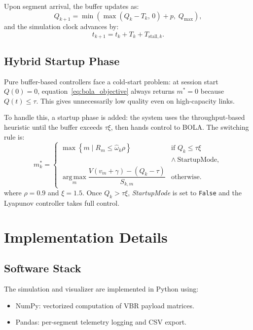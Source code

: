 \documentclass[conference]{IEEEtran}
\begin{document}
Upon segment arrival, the buffer updates as:
\begin{equation}
  Q_{k+1}=\min\!\left(\max(Q_k-T_k,\,0)+p,\;Q_{\max}\right),
  \label{eq:buffer_evolution}
\end{equation}
and the simulation clock advances by:
\begin{equation}
  t_{k+1}=t_k+T_k+T_{\text{stall},k}.
  \label{eq:clock_advance}
\end{equation}

\subsection{Hybrid Startup Phase}

Pure buffer-based controllers face a cold-start problem: at session
start $Q(0)=0$, equation~\eqref{eq:bola_objective} always returns $m^*=0$
because $Q(t)\le\tau$.  This gives unnecessarily low quality even on
high-capacity links.

To handle this, a startup phase is added: the system uses the
throughput-based heuristic until the buffer exceeds $\tau\xi$, then
hands control to BOLA.  The switching rule is:
\begin{equation}
  m_k^*=
  \begin{cases}
    \max\!\left\{m\mid R_m\le\hat{\omega}_k\rho\right\}
      & \text{if } Q_k\le\tau\xi \\
      & \wedge\ \text{StartupMode},\\[4pt]
    \operatorname*{arg\,max}_{m}
      \dfrac{V(v_m+\gamma)-(Q_k-\tau)}{S_{k,m}}
      & \text{otherwise.}
  \end{cases}
  \label{eq:hybrid_switch}
\end{equation}
where $\rho=0.9$ and $\xi=1.5$.  Once $Q_k>\tau\xi$, \textit{StartupMode}
is set to \texttt{False} and the Lyapunov controller takes full control.

\section{Implementation Details}

\subsection{Software Stack}

The simulation and visualizer are implemented in Python using:
\begin{itemize}
  \item NumPy: vectorized computation of VBR payload matrices.
  \item Pandas: per-segment telemetry logging and CSV export.
\end{itemize}
\end{document}
